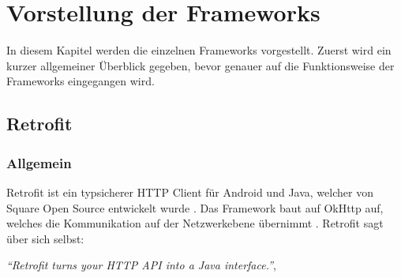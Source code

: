 \chapter{Vorstellung der Frameworks}
\label{chapter:frameworks}

In diesem Kapitel werden die einzelnen Frameworks vorgestellt. Zuerst wird ein kurzer allgemeiner Überblick gegeben, bevor genauer auf die Funktionsweise der Frameworks eingegangen wird.

\section{Retrofit}

\subsection{Allgemein}
Retrofit ist ein typsicherer HTTP Client für Android und Java, welcher von Square Open Source entwickelt wurde \cite{retrofit}. Das Framework baut auf OkHttp auf, welches die Kommunikation auf der Netzwerkebene übernimmt \cite{okhttp}. Retrofit sagt über sich selbst:

\begin{center}
	\textit{\textquotedblleft Retrofit turns your HTTP API into a Java interface.\textquotedblright}, \cite[Webseite von Retrofit]{retrofit} 
	\\
\end{center}

